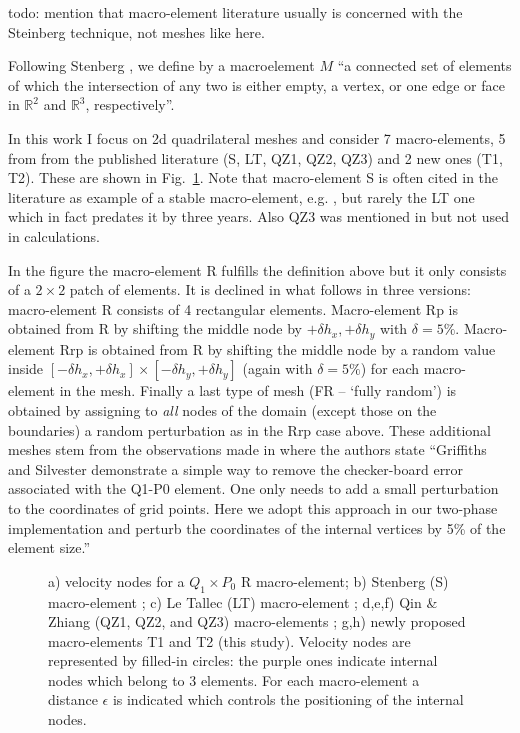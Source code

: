 \documentclass[a4paper,12pt]{article}
\begin{document}
{\color{red} todo: mention that macro-element literature usually is concerned with 
the Steinberg technique, not meshes like here.}


Following Stenberg \cite{sten90}, we define by a macroelement $M$ ``a connected set of elements of which the 
intersection of any two is either empty, a vertex, or one edge or face in $\mathbb{R}^2$ 
and $\mathbb{R}^3$, respectively''.

In this work I focus on 2d quadrilateral meshes and consider 7 
macro-elements, 5 from from the published literature (S, LT, QZ1, QZ2, QZ3) and 2 new ones (T1, T2).
These are shown in Fig.~\ref{fig:mes}.
Note that macro-element S is often cited in the literature as example of a stable macro-element, 
e.g. \cite{chba93,elsw}, but rarely the LT one which in fact predates it by three years. 
Also QZ3 was mentioned in \cite{idsn95} but not used in calculations. 

In the figure the macro-element R fulfills the definition above but 
it only consists of a $2\times 2$ patch of elements. It is declined in what follows in three
versions: macro-element R consists of 4 rectangular elements. 
Macro-element Rp is obtained from R by shifting the middle node by $+\delta h_x,+\delta h_y$
with $\delta =5\%$. Macro-element Rrp is obtained from R by shifting the middle node
by a random value inside $[-\delta h_x,+\delta h_x]\times[-\delta h_y,+\delta h_y]$ (again with $\delta =5\%$) 
for each macro-element in the mesh.
Finally a last type of mesh (FR -- `fully random') is obtained by assigning 
to {\it all} nodes of the domain (except those on the boundaries) a random perturbation as in the Rrp case above. 
These additional meshes stem from the observations made in \cite{lumh24} where the 
authors state 
``Griffiths and Silvester \cite{grsi94} demonstrate a simple way to remove the checker-board error associated with
the Q1-P0 element. One only needs to add a small perturbation to the coordinates of grid points. Here we adopt
this approach in our two-phase implementation and perturb the coordinates of the internal vertices by 5\% of the
element size.''

\begin{figure}[t]
\centering

\caption{
a) velocity nodes for a $Q_1\times P_0$ R macro-element;
b) Stenberg (S) macro-element \cite{sten84}; 
c) Le Tallec (LT) macro-element \cite{leta81,leru86}; 
d,e,f) Qin \& Zhiang (QZ1, QZ2, and QZ3) macro-elements \cite{qizh07}; 
g,h) newly proposed macro-elements T1 and T2 (this study).
Velocity nodes are represented by filled-in circles: 
the purple ones indicate internal nodes which belong to 3 elements.
For each macro-element a distance $\epsilon$ is indicated which controls the positioning of the internal nodes.
\label{fig:mes}}
\end{figure}
\end{document}
